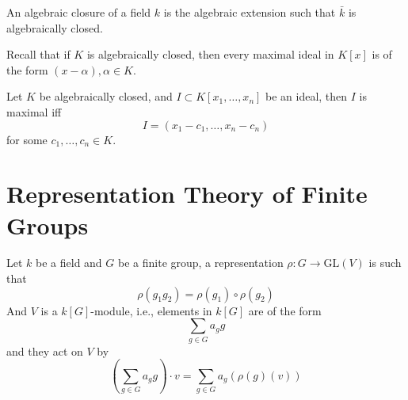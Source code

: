 \documentclass[openany]{book}
\begin{document}
\begin{defn}
    An algebraic closure of a field $k$ is the algebraic extension such that $\bar{k}$ is algebraically closed.
\end{defn}

\begin{prop}
    Recall that if $K$ is algebraically closed, then every maximal ideal in $K[x]$ is of the form $(x-\alpha),\alpha\in K$.
\end{prop}
\begin{prop}
    Let $K$ be algebraically closed, and $I\subset K[x_1,\dots,x_n]$ be an ideal, then $I$ is maximal iff 
    \begin{equation*}
        I=(x_1-c_1,\dots, x_n-c_n)
    \end{equation*}
    for some $c_1,\dots,c_n\in K$.
\end{prop}











\chapter{Representation Theory of Finite Groups}



Let $k$ be a field and $G$ be a finite group, a representation $\rho: G\to\text{GL}(V)$ is such that 
\begin{equation*}
    \rho(g_1g_2)=\rho(g_1)\circ\rho(g_2)
\end{equation*}
And $V$ is a $k[G]$-module, i.e., elements in $k[G]$ are of the form 
\begin{equation*}
    \sum_{g\in G}a_gg
\end{equation*}
and they act on $V$ by 
\begin{equation*}
    \left( \sum_{g\in G}a_gg\right)\cdot v=\sum_{g\in G}a_g\left(\rho(g)(v)\right)
\end{equation*}
\end{document}
